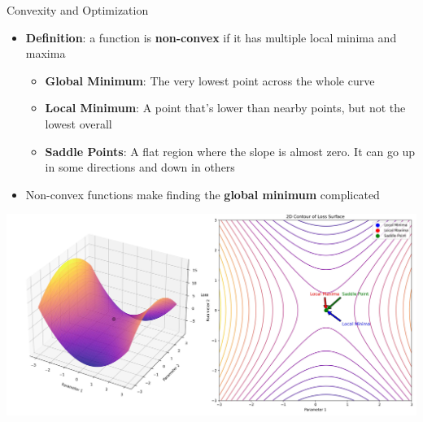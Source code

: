 \documentclass[serif, aspectratio=169]{beamer}
\begin{document}
\begin{frame}{Convexity and Optimization}
    \begin{itemize}
        \item \textbf{Definition}: a function is \textbf{non-convex} if it has multiple local minima and maxima
        \begin{itemize}
            \item \textbf{Global Minimum}: The very lowest point across the whole curve
            \item \textbf{Local Minimum}:  A point that's lower than nearby points, but not the lowest overall
            \item \textbf{Saddle Points}: A flat region where the slope is almost zero. It can go up in some directions and down in others
        \end{itemize}
        \item Non-convex functions make finding the \textbf{global minimum} complicated
    \end{itemize}
    \begin{center}
        \begin{minipage}{0.5\linewidth}
            \centering
            \includegraphics[height=.5\textheight]{pic/Saddle_point.jpg}
        \end{minipage}
    \end{center}
\end{frame}
\end{document}
